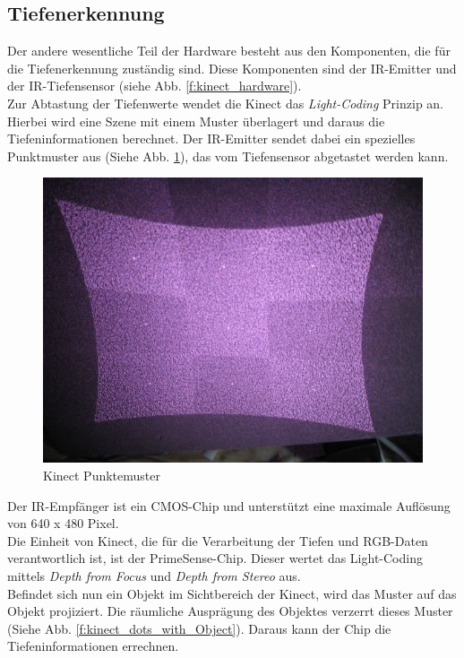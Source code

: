 \subsection{Tiefenerkennung}
	
	Der andere wesentliche Teil der Hardware besteht aus den Komponenten, die für die Tiefenerkennung
	zuständig sind. Diese Komponenten sind der \acf{IR-Emitter} und der IR-Tiefensensor (siehe	 Abb. 	 
	\ref{f:kinect_hardware}).\\
	\noindent
	Zur Abtastung der Tiefenwerte wendet die Kinect das \textit{Light-Coding} Prinzip an. Hierbei wird
	eine Szene mit einem Muster überlagert und daraus die Tiefeninformationen berechnet.
	Der \acs{IR-Emitter} sendet dabei ein spezielles Punktmuster aus (Siehe Abb. \ref{f:kinect_dots}),
	das vom Tiefensensor abgetastet werden kann.	
	
	\begin{figure}[H]						
		\centering							
		\includegraphics[scale=0.5]{Bilder/kinect_dots.jpg}			
		\caption{Kinect Punktemuster}						
		\label{f:kinect_dots}						
	\end{figure}
	
	\noindent	
	Der IR-Empfänger ist ein \acf{CMOS}-Chip und unterstützt eine maximale Auflösung
	von 640 x 480 Pixel.
	\\
	Die Einheit von Kinect, die für die Verarbeitung der Tiefen und RGB-Daten verantwortlich ist, ist
	der PrimeSense-Chip. Dieser wertet das Light-Coding mittels \textit{Depth from Focus} und 
	\textit{Depth from Stereo} aus.\cite{pdf:maccormick}
	\\
	Befindet sich nun ein Objekt im Sichtbereich der Kinect, wird das Muster auf das Objekt projiziert. Die räumliche Ausprägung des Objektes verzerrt dieses Muster (Siehe Abb. \ref{f:kinect_dots_with_Object}). Daraus kann der Chip die Tiefeninformationen errechnen.		
	
